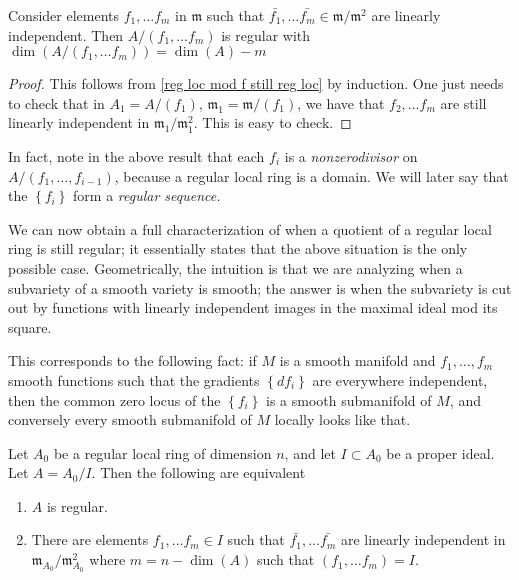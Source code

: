 \begin{corollary} \label{quotientreg44} Consider elements $f_1, \ldots f_m$ in $\mathfrak{m}$ such
that $\bar{f_1}, \ldots \bar{f_m} \in \mathfrak{m}/\mathfrak{m}^2$ are linearly independent. Then $A/(f_1, \ldots f_m)$ is regular with $\dim(A/(f_1, \ldots f_m))=\dim(A)-m$
\label{reg local mod fs still reg loc}
\end{corollary}
\begin{proof} This follows from \cref{reg loc mod f still reg loc} by induction. One just needs to check that in $A_1=A/(f_1)$, $\mathfrak{m}_1=\mathfrak{m}/(f_1)$, we have that $f_2, \ldots f_m$ are still linearly independent in $\mathfrak{m}_1/\mathfrak{m}_1^2$. This is easy to check.
\end{proof}

\begin{remark}
In fact, note in the above result that each $f_i$ is a \emph{nonzerodivisor} on $A/(f_1, \dots,
f_{i-1})$, because a regular local ring is a domain. We will later say that the
$\left\{f_i\right\}$ form a \emph{regular sequence.}
\end{remark}

We can now obtain a full characterization of when a quotient of a regular local
ring is still regular; it essentially states that the above situation is the
only possible case. Geometrically, the intuition is that we are analyzing when
a subvariety of a smooth variety is smooth; the answer is when the subvariety
is cut out by functions with linearly independent images in the maximal ideal
mod its square. 

This corresponds to the following fact: if $M$ is a smooth manifold and $f_1,
\dots, f_m$ smooth functions such that the gradients $\left\{df_i\right\}$ are
everywhere independent, then the common zero locus of the $\left\{f_i\right\}$
is a smooth submanifold of $M$, and conversely every smooth submanifold of $M$
locally looks like that.

\begin{theorem} \label{quotientreg} Let $A_0$ be a regular local ring of dimension $n$, and 
let $I \subset A_0$ be a proper ideal. Let $A = A_0/I$.
 Then the following are equivalent
\begin{enumerate}
\item $A$ is regular.
\item There are elements $f_1, \ldots f_m \in I$ such that $\bar{f_1}, \ldots \bar{f_m}$ are linearly independent in $\mathfrak{m}_{A_0}/\mathfrak{m}_{A_0}^2$ where $m=n-\dim(A)$ such that $(f_1, \ldots f_m)=I$.
\end{enumerate}
\label{reg loc main thm}
\end{theorem}

